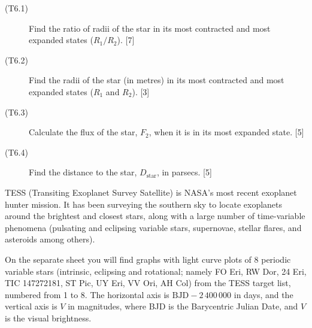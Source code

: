 \begin{description}
\item[(T6.1)] Find the ratio of radii of the star in its most contracted and
  most expanded states ($R_1/R_2$). \hfill[7]
\item[(T6.2)] Find the radii of the star (in metres) in its most contracted
  and most expanded states ($R_1$ and $R_2$). \hfill[3]
\item[(T6.3)] Calculate the flux of the star, $F_2$, when it is in its most
  expanded state. \hfill[5]
\item[(T6.4)] Find the distance to the star, $D_{\mathrm{star}}$, in
  parsecs. \hfill[5]
\end{description}

TESS (Transiting Exoplanet Survey Satellite) is NASA's most recent exoplanet
hunter mission. It has been surveying the southern sky to locate exoplanets
around the brightest and closest stars, along with a large number of
time-variable phenomena (pulsating and eclipsing variable stars, supernovae,
stellar flares, and asteroids among others).

On the separate sheet you will find graphs with light curve plots of 8
periodic variable stars (intrinsic, eclipsing and rotational; namely FO Eri,
RW Dor, 24 Eri, TIC 147272181, ST Pic, UY Eri, VV Ori, AH Col) from the TESS
target list, numbered from 1 to 8. The horizontal axis is
$\mathrm{BJD} - 2\,400\,000$ in days, and the vertical axis is $V$ in
magnitudes, where BJD is the Barycentric Julian Date, and $V$ is the visual
brightness.

